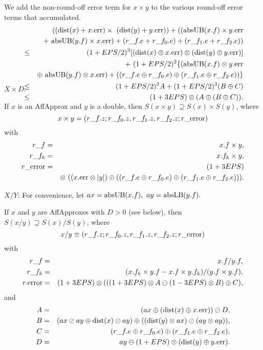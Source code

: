 We add the non-round-off error term for $x \times y$ to the various round-off error terms that accumulated.
\begin{eqnarray*}
&&\hskip-48pt (({\rm dist}(x) + x.{\rm err}) \times\ ({\rm dist}(y) + y.{\rm err})) +
 (({\rm absUB}(x.f) \times y.{\rm err} 
\\
&& +\ 
{\rm absUB}(y.f) \times x.{\rm err}) +
 (r\_f.e + r\_f_0.e) + (r\_f_1.e + r\_f_2.e))
\\
&\le& 
(1+EPS/2)^3[({\rm dist}(x) \oplus x.{\rm err})\otimes ({\rm dist}(y) \oplus y.{\rm err})]\\
&& +\
 (1+EPS/2)^2\{({\rm absUB}(x.f) \otimes y.{\rm err} 
\\
& &\oplus\ 
{\rm absUB}(y.f) \otimes x.{\rm err}) +
((r\_f.e \oplus r\_f_0.e) \oplus (r\_f_1.e \oplus r\_f_2.e))\}
\\
&\le& (1+EPS/2)^3 A + (1+EPS/2)^3 (B \oplus C) \\
&\le& (1+3EPS) \otimes (A \oplus (B \oplus C) ). \\
\noalign{\vskip-36pt}
\end{eqnarray*}
\enddemo

$X \times D$: 

 \hskip-8pt If $x$ is an 
AffApprox  and $y$ is a double{\rm ,} 
then $S(x \times y) \supseteq S(x) \times S(y)${\rm ,} where
$$x \times y = (r\_f.z; r\_f_0.z, r\_f_1.z, r\_f_2.z; r\_{\rm error})$$
with
\begin{eqnarray*}
r\_f& =& x.f \times y,\\
r\_f_k &=& x.f_k \times y,\\
r\_{\rm error} &=& (1+3EPS)\\
&& \otimes\ ( (x.{\rm err} \otimes |y|) \oplus
( (r\_f.e \oplus r\_f_0.e) \oplus (r\_f_1.e \oplus r\_f_2.e)) ).
\end{eqnarray*}
\endproclaim

$X/Y$: 
For convenience, let  $ax = {\rm absUB}(x.f),\ ay = {\rm absLB}(y.f).$ 
 
 If $x$ and $y$ are 
{\rm AffApproxes}  with $D > 0$ {\rm (}\/see below{\rm ),} then
$S(x / y) \supseteq S(x) / S(y)${\rm ,} where
$$x / y \equiv (r\_f.z; r\_f_0.z, r\_f_1.z, r\_f_2.z; r\_{\rm error})$$
with
\begin{eqnarray*}
r\_f &=& x.f / y.f,
\\
r\_f_k& =& (x.f_k \times y.f - x.f \times y.f_k)/ (y.f \times y.f),\\
r.{\rm error} & =& (1 + 3EPS) \otimes (
((1 + 3EPS) \otimes A \ominus (1 - 3EPS) \otimes B )\oplus C ),\end{eqnarray*}
and
\begin{eqnarray*}
A &=& (ax \oplus ({\rm dist}(x) \oplus x.{\rm err})) \oslash D,\\
B &=& (ax \oslash ay \oplus {\rm dist}(x) \oslash ay)
\oplus  (({\rm dist}(y) \otimes ax) \oslash (ay \otimes ay)),\\
C &=& (r\_f.e \oplus r\_f_0.e) \oplus (r\_f_1.e \oplus
r\_f_2.e),\\
D &=& ay \ominus (1 + EPS) \otimes ({\rm dist}(y) \oplus y.{\rm err}).
\end{eqnarray*}
\endproclaim

